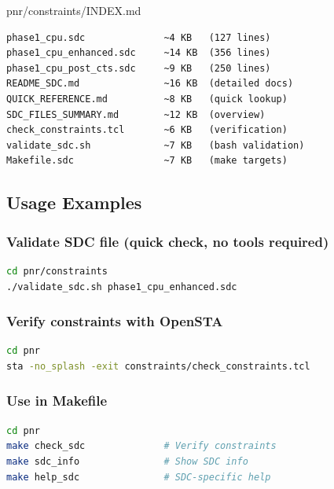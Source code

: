 \begin{relocated}{pnr/constraints/INDEX.md}
\begin{lstlisting}[language={}]
phase1_cpu.sdc              ~4 KB   (127 lines)
phase1_cpu_enhanced.sdc     ~14 KB  (356 lines)
phase1_cpu_post_cts.sdc     ~9 KB   (250 lines)
README_SDC.md               ~16 KB  (detailed docs)
QUICK_REFERENCE.md          ~8 KB   (quick lookup)
SDC_FILES_SUMMARY.md        ~12 KB  (overview)
check_constraints.tcl       ~6 KB   (verification)
validate_sdc.sh             ~7 KB   (bash validation)
Makefile.sdc                ~7 KB   (make targets)
\end{lstlisting}

\subsection{Usage Examples}\label{tm:pd:constraints-index:usage-examples}

\subsubsection{Validate SDC file (quick check, no tools required)}\label{tm:pd:constraints-index:validate-sdc-file-quick-check-no-tools-required}

\begin{lstlisting}[language=bash]
cd pnr/constraints
./validate_sdc.sh phase1_cpu_enhanced.sdc
\end{lstlisting}

\subsubsection{Verify constraints with OpenSTA}\label{tm:pd:constraints-index:verify-constraints-with-opensta}

\begin{lstlisting}[language=bash]
cd pnr
sta -no_splash -exit constraints/check_constraints.tcl
\end{lstlisting}

\subsubsection{Use in Makefile}\label{tm:pd:constraints-index:use-in-makefile}

\begin{lstlisting}[language=bash]
cd pnr
make check_sdc              # Verify constraints
make sdc_info               # Show SDC info
make help_sdc               # SDC-specific help
\end{lstlisting}


\end{relocated}
